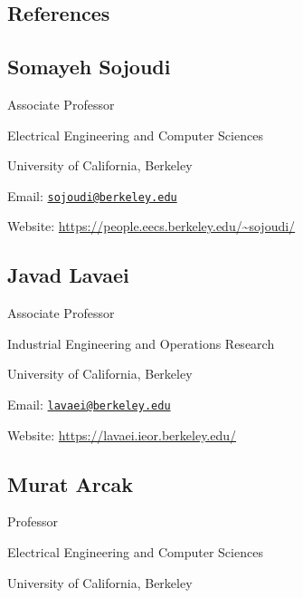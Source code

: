 \begin{references}
\section{References}

\subsection{Somayeh Sojoudi}
\cvdates{}{}

\begin{adjustwidth}{\sectionwidth}{}
Associate Professor

Electrical Engineering and Computer Sciences

University of California, Berkeley

Email: \href{mailto:sojoudi@berkeley.edu}{\texttt{sojoudi@berkeley.edu}}

Website: \url{https://people.eecs.berkeley.edu/~sojoudi/}
\end{adjustwidth}

\vspace*{\subsectionskip}

\subsection{Javad Lavaei}
\cvdates{}{}

\begin{adjustwidth}{\sectionwidth}{}
Associate Professor

Industrial Engineering and Operations Research

University of California, Berkeley

Email: \href{mailto:lavaei@berkeley.edu}{\texttt{lavaei@berkeley.edu}}

Website: \url{https://lavaei.ieor.berkeley.edu/}
\end{adjustwidth}

\vspace*{\subsectionskip}

\subsection{Murat Arcak}
\cvdates{}{}

\begin{adjustwidth}{\sectionwidth}{}
Professor

Electrical Engineering and Computer Sciences

University of California, Berkeley


\end{adjustwidth}
\end{references}
